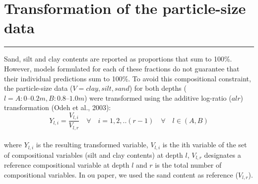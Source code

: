 \documentclass[]{book}
\begin{document}
\hypertarget{transformation-of-the-particle-size-data}{%
\chapter{Transformation of the particle-size data}\label{transformation-of-the-particle-size-data}}

\begin{center}\rule{0.5\linewidth}{\linethickness}\end{center}

Sand, silt and clay contents are reported as proportions that sum to 100\%. However, models formulated for each of these fractions do not guarantee that their individual predictions sum to 100\%. To avoid this compositional constraint, the particle-size data (\(V = {clay, silt, sand}\)) for both depths (\(l = {A: 0–0.2 m, B: 0.8–1.0 m}\)) were transformed using the additive log-ratio (\(alr\)) transformation (Odeh et al., 2003):
\[Y_{l,i} = \frac{V_{l,i}}{V_{l,r}} \quad \forall \quad i = 1,2,.. (r -1) \quad \forall \quad l \in (A,B)\]\\
where \(Y_{l,i}\) is the resulting transformed variable, \(V_{l,i}\) is the ith variable of the set of compositional variables (silt and clay contents) at depth \(l\), \(V_{l,r}\) designates a reference compositional variable at depth
\(l\) and \(r\) is the total number of compositional variables. In ou paper, we used the sand content as reference (\(V_{l,r}\)).
\end{document}
